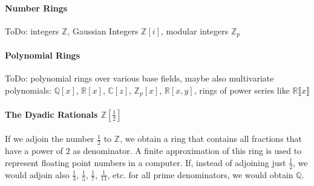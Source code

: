 \paragraph{Number Rings}
ToDo: integers $\mathbb{Z}$, Gaussian Integers $\mathbb{Z}[i]$, modular integers $\mathbb{Z}_p$

\paragraph{Polynomial Rings}
ToDo: polynomial rings over various base fields, maybe also multivariate polynomials: $\mathbb{Q}[x]$, $\mathbb{R}[x]$, $\mathbb{C}[z]$, $\mathbb{Z}_p[x]$, $\mathbb{R}[x,y]$, rings of power series like
$\mathbb{R} \llbracket x \rrbracket$


\paragraph{The Dyadic Rationals $\mathbb{Z}[\frac{1}{2}]$}
If we adjoin the number $\frac{1}{2}$ to $\mathbb{Z}$, we obtain a ring that contains all fractions that have a power of $2$ as denominator. A finite approximation of this ring is used to represent floating point numbers in a computer. If, instead of adjoining just $\frac{1}{2}$, we would adjoin also $\frac{1}{3}$, $\frac{1}{5}$, $\frac{1}{7}$, $\frac{1}{11}$, etc. for all prime denominators, we would obtain $\mathbb{Q}$.

